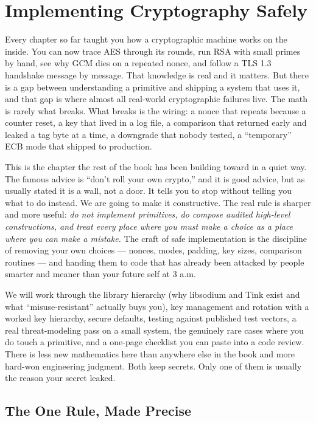 \chapter{Implementing Cryptography Safely}

Every chapter so far taught you how a cryptographic machine works on the inside.
You can now trace AES through its rounds, run RSA with small primes by hand, see
why GCM dies on a repeated nonce, and follow a TLS 1.3 handshake message by
message. That knowledge is real and it matters. But there is a gap between
understanding a primitive and shipping a system that uses it, and that gap is
where almost all real-world cryptographic failures live. The math is rarely what
breaks. What breaks is the wiring: a nonce that repeats because a counter reset, a
key that lived in a log file, a comparison that returned early and leaked a tag
byte at a time, a downgrade that nobody tested, a ``temporary'' ECB mode that
shipped to production.

This is the chapter the rest of the book has been building toward in a quiet way.
The famous advice is ``don't roll your own crypto,'' and it is good advice, but as
usually stated it is a wall, not a door. It tells you to stop without telling you
what to do instead. We are going to make it constructive. The real rule is sharper
and more useful: \emph{do not implement primitives, do compose audited high-level
constructions, and treat every place where you must make a choice as a place where
you can make a mistake.} The craft of safe implementation is the discipline of
removing your own choices --- nonces, modes, padding, key sizes, comparison
routines --- and handing them to code that has already been attacked by people
smarter and meaner than your future self at 3 a.m.

We will work through the library hierarchy (why libsodium and Tink exist and what
``misuse-resistant'' actually buys you), key management and rotation with a worked
key hierarchy, secure defaults, testing against published test vectors, a real
threat-modeling pass on a small system, the genuinely rare cases where you do
touch a primitive, and a one-page checklist you can paste into a code review.
There is less new mathematics here than anywhere else in the book and more
hard-won engineering judgment. Both keep secrets. Only one of them is usually the
reason your secret leaked.

\chapterline

\section{The One Rule, Made Precise}
\label{ch39:one-rule}

